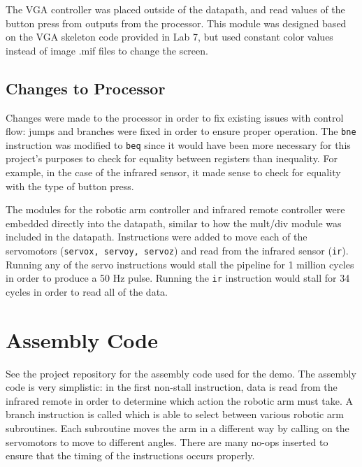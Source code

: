 \documentclass{article}
\begin{document}
    The VGA controller was placed outside of the datapath, and read values of the button press from outputs from the processor. This module was designed based on the VGA skeleton code provided in Lab 7, but used constant color values instead of image .mif files to change the screen.
    
    \subsection{Changes to Processor}
    Changes were made to the processor in order to fix existing issues with control flow: jumps and branches were fixed in order to ensure proper operation. The {\tt bne} instruction was modified to {\tt beq} since it would have been more necessary for this project's purposes to check for equality between registers than inequality. For example, in the case of the infrared sensor, it made sense to check for equality with the type of button press. \\\hspace*{\fill}
    
    The modules for the robotic arm controller and infrared remote controller were embedded directly into the datapath, similar to how the mult/div module was included in the datapath. Instructions were added to move each of the servomotors ({\tt servox, servoy, servoz}) and read from the infrared sensor ({\tt ir}). Running any of the servo instructions would stall the pipeline for 1 million cycles in order to produce a 50 Hz pulse. Running the {\tt ir} instruction would stall for 34 cycles in order to read all of the data.
    
\section{Assembly Code}
    See the project repository for the assembly code used for the demo. The assembly code is very simplistic: in the first non-stall instruction, data is read from the infrared remote in order to determine which action the robotic arm must take. A branch instruction is called which is able to select between various robotic arm subroutines. Each subroutine moves the arm in a different way by calling on the servomotors to move to different angles. There are many no-ops inserted to ensure that the timing of the instructions occurs properly.
\end{document}
